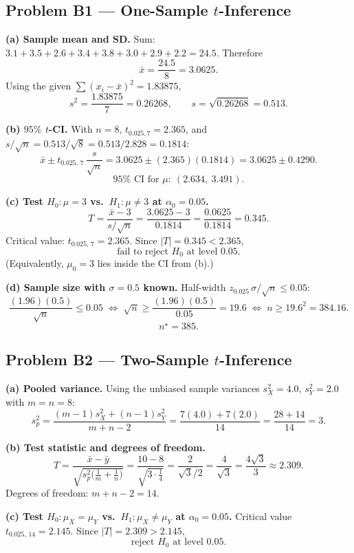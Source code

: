 \documentclass[11pt]{article}
\begin{document}
\subsection*{Problem B1 --- One-Sample $t$-Inference}

\textbf{(a) Sample mean and SD.} Sum: $3.1+3.5+2.6+3.4+3.8+3.0+2.9+2.2 = 24.5$. Therefore
\[
\bar{x} = \frac{24.5}{8} = \boxed{3.0625.}
\]
Using the given $\sum (x_i - \bar{x})^2 = 1.83875$,
\[
s^2 = \frac{1.83875}{7} = 0.26268,
\qquad
s = \sqrt{0.26268} = \boxed{0.513.}
\]

\textbf{(b) $95\%$ $t$-CI.} With $n = 8$, $t_{0.025, 7} = 2.365$, and $s/\sqrt{n} = 0.513/\sqrt{8} = 0.513/2.828 = 0.1814$:
\[
\bar{x} \pm t_{0.025,\,7}\,\frac{s}{\sqrt{n}}
= 3.0625 \pm (2.365)(0.1814)
= 3.0625 \pm 0.4290.
\]
\[
\boxed{95\% \text{ CI for }\mu:\ (2.634,\ 3.491).}
\]

\textbf{(c) Test $H_0: \mu = 3$ vs.\ $H_1: \mu \ne 3$ at $\alpha_0 = 0.05$.}
\[
T = \frac{\bar{x} - 3}{s/\sqrt{n}} = \frac{3.0625 - 3}{0.1814} = \frac{0.0625}{0.1814} = 0.345.
\]
Critical value: $t_{0.025,\,7} = 2.365$. Since $|T| = 0.345 < 2.365$,
\[
\boxed{\text{fail to reject } H_0\text{ at level } 0.05.}
\]
(Equivalently, $\mu_0 = 3$ lies inside the CI from (b).)

\textbf{(d) Sample size with $\sigma = 0.5$ known.} Half-width $z_{0.025}\, \sigma/\sqrt{n} \le 0.05$:
\[
\frac{(1.96)(0.5)}{\sqrt{n}} \le 0.05
\;\Longleftrightarrow\;
\sqrt{n} \ge \frac{(1.96)(0.5)}{0.05} = 19.6
\;\Longleftrightarrow\;
n \ge 19.6^2 = 384.16.
\]
\[
\boxed{n^\star = 385.}
\]

\subsection*{Problem B2 --- Two-Sample $t$-Inference}

\textbf{(a) Pooled variance.} Using the unbiased sample variances $s_X^2 = 4.0$, $s_Y^2 = 2.0$ with $m = n = 8$:
\[
s_p^2 = \frac{(m-1)s_X^2 + (n-1)s_Y^2}{m + n - 2}
= \frac{7(4.0) + 7(2.0)}{14}
= \frac{28 + 14}{14}
= \boxed{3.}
\]

\textbf{(b) Test statistic and degrees of freedom.}
\[
T = \frac{\bar{x} - \bar{y}}{\sqrt{s_p^2\bigl(\tfrac{1}{m}+\tfrac{1}{n}\bigr)}}
= \frac{10 - 8}{\sqrt{3 \cdot \tfrac{1}{4}}}
= \frac{2}{\sqrt{3}/2}
= \frac{4}{\sqrt{3}}
= \frac{4\sqrt{3}}{3} \approx 2.309.
\]
Degrees of freedom: $m + n - 2 = \boxed{14}$.

\textbf{(c) Test $H_0: \mu_X = \mu_Y$ vs.\ $H_1: \mu_X \ne \mu_Y$ at $\alpha_0 = 0.05$.} Critical value $t_{0.025,\,14} = 2.145$. Since $|T| = 2.309 > 2.145$,
\[
\boxed{\text{reject } H_0\text{ at level } 0.05.}
\]
\end{document}
